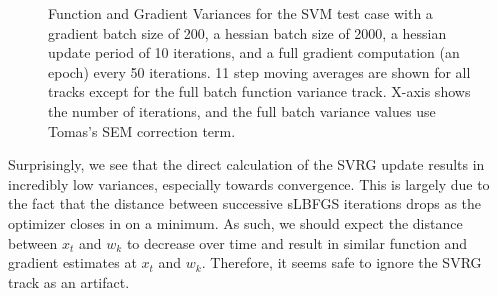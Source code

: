 \documentclass{article}
\begin{document}
\begin{figure}[h!]
\centering
{}
\caption{Function and Gradient Variances for the SVM test case with a gradient batch size of 200, a hessian batch size of 2000, a hessian update period of 10 iterations, and a full gradient computation (an epoch) every 50 iterations. 11 step moving averages are shown for all tracks except for the full batch function variance track. X-axis shows the number of iterations, and the full batch variance values use Tomas's SEM correction term.}
\label{fig:var_200}
\end{figure}
Surprisingly, we see that the direct calculation of the SVRG update results in incredibly low variances, especially towards convergence. This is largely due to the fact that the distance between successive sLBFGS iterations drops as the optimizer closes in on a minimum. As such, we should expect the distance between $x_t$ and $w_k$ to decrease over time and result in similar function and gradient estimates at $x_t$ and $w_k$. Therefore, it seems safe to ignore the SVRG track as an artifact. 
\end{document}

